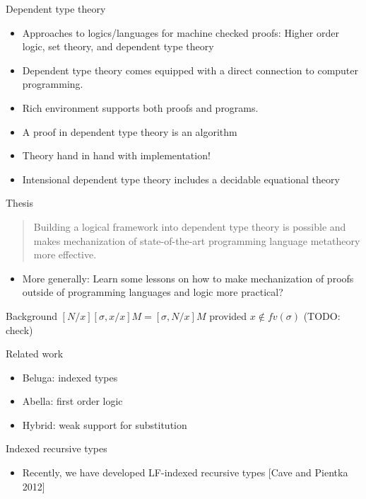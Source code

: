 \documentclass[usenames,dvipsnames]{beamer}
\begin{document}
\begin{frame}{Dependent type theory}
\begin{itemize}
\item Approaches to logics/languages for
machine checked proofs: Higher order logic, set theory, and dependent
type theory
\item Dependent type theory comes equipped with a direct
connection to computer programming.
\item Rich environment supports both proofs and
programs.
\item A proof in dependent type theory is an algorithm
\item Theory hand in hand with implementation!
\item Intensional dependent type theory includes a decidable equational theory
\end{itemize}
\end{frame}

\begin{frame}{Thesis}
\begin{quote}Building a logical framework into dependent type
theory is possible and makes mechanization of state-of-the-art programming
language metatheory more effective.
\end{quote}
\begin{itemize}
\pause
\item More generally: Learn some lessons on how
to make mechanization of proofs outside of programming languages and
logic more practical?
\end{itemize}
\end{frame}

\begin{frame}{Background}
$[N/x][\sigma,x/x]M = [\sigma,N/x]M$ provided $x \not\in fv(\sigma)$ (TODO: check)
\end{frame}

\begin{frame}{Related work}
\begin{itemize}
\item Beluga: indexed types
\item Abella: first order logic
\item Hybrid: weak support for substitution
\end{itemize}
\end{frame}

\begin{frame}{Indexed recursive types}
\begin{itemize}
\item Recently, we have developed LF-indexed recursive types
[Cave and Pientka 2012]
\end{itemize}
\end{frame}
\end{document}
